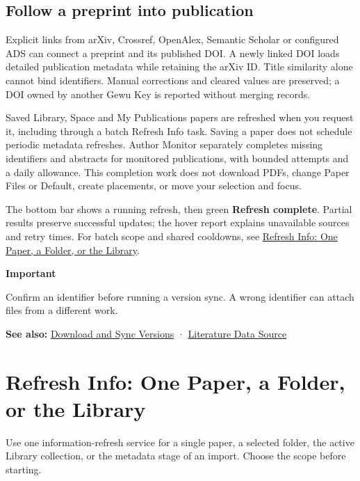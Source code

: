 \documentclass[10pt,letterpaper,oneside]{scrreprt}
\newenvironment{GewuRelated}{\par\nobreak\vspace{3pt}\nobreak\begingroup\small\sffamily\begin{samepage}\noindent}{\par\end{samepage}\endgroup}
\newenvironment{GewuLead}
  {\begin{list}{}{\leftmargin=0pt\rightmargin=0pt\topsep=0pt\partopsep=0pt\parsep=0pt}\item\relax
    \sffamily\fontsize{10.5}{13.2}\selectfont\color{GewuMuted}}
  {\end{list}}
\renewenvironment{quote}
  {\Needspace{5\baselineskip}\begin{tcolorbox}[enhanced,breakable,colback=GewuPale,colframe=GewuPale,boxrule=0pt,
    borderline west={1.6pt}{0pt}{GewuBlue},arc=1.2mm,left=2.5mm,right=2.5mm,top=1.7mm,bottom=1.7mm,
    before skip=4pt,after skip=5pt,fontupper=\color{GewuInk}\small]}
  {\end{tcolorbox}}
\begin{document}
\subsection{Follow a preprint into publication}\label{follow-a-preprint-into-publication}

Explicit links from arXiv, Crossref, OpenAlex, Semantic Scholar or configured ADS can connect a preprint and its published DOI. A newly linked DOI loads detailed publication metadata while retaining the arXiv ID. Title similarity alone cannot bind identifiers. Manual corrections and cleared values are preserved; a DOI owned by another Gewu Key is reported without merging records.

Saved Library, Space and My Publications papers are refreshed when you request it, including through a batch Refresh Info task. Saving a paper does not schedule periodic metadata refreshes. Author Monitor separately completes missing identifiers and abstracts for monitored publications, with bounded attempts and a daily allowance. This completion work does not download PDFs, change Paper Files or Default, create placements, or move your selection and focus.

The bottom bar shows a running refresh, then green \textbf{Refresh complete}. Partial results preserve successful updates; the hover report explains unavailable sources and retry times. For batch scope and shared cooldowns, see \hyperref[loader-maintenance]{Refresh Info: One Paper, a Folder, or the Library}.

\begin{quote}
\textbf{Important}

Confirm an identifier before running a version sync. A wrong identifier can attach files from a different work.
\end{quote}

\begin{GewuRelated}
\textbf{See also:} \hyperref[download-sync]{Download and Sync Versions} · \hyperref[citation-settings]{Literature Data Source}
\end{GewuRelated}

\section{Refresh Info: One Paper, a Folder, or the Library}\label{loader-maintenance}

\begin{GewuLead}
Use one information-refresh service for a single paper, a selected folder, the active Library collection, or the metadata stage of an import. Choose the scope before starting.
\end{GewuLead}
\end{document}
